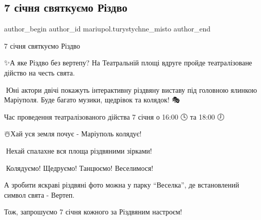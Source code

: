 
 
 
 
 

\subsection{7 січня святкуємо Різдво}
\label{sec:05_01_2022.fb.mariupol.turystychne_misto.1.7_sichnja_svjatkujemo_rizdvo}

\ifcmt
 author_begin
   author_id mariupol.turystychne_misto
 author_end
\fi

7 січня святкуємо Різдво 🌟📆\par
✨А яке Різдво без вертепу? На Театральній площі вдруге пройде театралізоване дійство на честь свята.\par
🎄Юні актори двічі покажуть інтерактивну різдвяну виставу під головною ялинкою Маріуполя. Буде багато музики, щедрівок та колядок! 🎭\par
Час проведення театралізованого дійства 7 січня о 16:00  🕓  та  18:00 🕖\par
☃️Хай уся земля почує  - Маріуполь колядує! \par
🌟Нехай спалахне вся площа різдвяними зірками!\par
🎉Колядуємо! Щедруємо! Танцюємо! Веселимося!\par
А зробити яскраві різдвяні фото можна у парку \enquote{Веселка}, де встановлений символ свята - Вертеп.🤱\par
Тож, запрошуємо 7 січня кожного за Різдвяним настроєм!🤗\par
